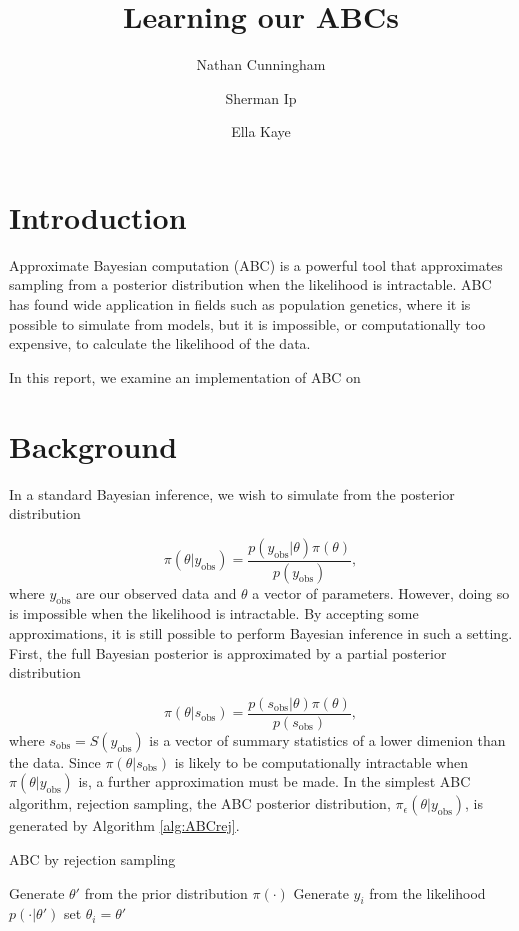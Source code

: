 \documentclass[a4paper,10pt]{article}
\title{Learning our ABCs}
\author{Nathan Cunningham \and Sherman Ip \and Ella Kaye}
\begin{document}
\maketitle

\section{Introduction}
Approximate Bayesian computation (ABC) is a powerful tool that approximates sampling from a posterior distribution when the likelihood is intractable. ABC has found wide application in fields such as population genetics, where it is possible to simulate from models, but it is impossible, or computationally too expensive, to calculate the likelihood of the data.

In this report, we examine an implementation of ABC on 

\section{Background}
\label{sec:bg}
In a standard Bayesian inference, we wish to simulate from the posterior distribution

\[
\pi(\theta | y_\textrm{obs}) = \frac{p(y_\textrm{obs} | \theta) \pi(\theta)}{p(y_\textrm{obs})},
\]
where $y_\textrm{obs}$ are our observed data and $\theta$ a vector of parameters. However, doing so is impossible when the likelihood is intractable. By accepting some approximations, it is still possible to perform Bayesian inference in such a setting. First, the full Bayesian posterior is approximated by a partial posterior distribution

\[
\pi(\theta | s_\textrm{obs}) = \frac{p(s_\textrm{obs} | \theta) \pi(\theta)}{p(s_\textrm{obs})},
\]
where $s_\textrm{obs} = S(y_\textrm{obs})$ is a vector of summary statistics of a lower dimenion than the data. Since $\pi(\theta | s_\textrm{obs})$ is likely to be computationally intractable when $\pi(\theta | y_\textrm{obs})$ is, a further approximation must be made. In the simplest ABC algorithm, rejection sampling, the ABC posterior distribution, $\pi_{\epsilon}(\theta | y_\textrm{obs})$, is generated by Algorithm \ref{alg:ABCrej}.

\begin{algorithm}
\caption{ABC by rejection sampling} \label{alg:ABCrej}
\begin{algorithmic}
\REPEAT
\STATE Generate $\theta'$ from the prior distribution $\pi(\cdot)$
\STATE Generate $y_i$ from the likelihood $p(\cdot | \theta')$
\STATE set $\theta_i = \theta'$
\ENDFOR
\end{algorithmic}
\end{algorithm}
\end{document}
